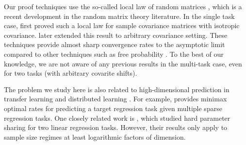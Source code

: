 Our proof techniques use the so-called local law of random matrices \cite{erdos2017dynamical}, which is a recent development in the random matrix theory literature.
In the single task case, \citet{isotropic} first proved such a local law for sample covariance matrices with isotropic covariance.
\citet{Anisotropic} later extended this result to arbitrary covariance setting.
These techniques provide almost sharp convergence rates to the asymptotic limit compared to other techniques such as free probability \cite{nica2006lectures}.
To the best of our knowledge, we are not aware of any previous results in the multi-task case, even for two tasks (with arbitrary covarite shifts).

The problem we study here is also related to high-dimensional prediction in transfer learning \cite{li2020transfer,bastani2020predicting} and distributed learning \cite{dobriban2018high}.
For example, \citet{li2020transfer} provides minimax optimal rates for predicting a target regression task given multiple sparse regression tasks.
One closely related work is \citet{WZR20}, which studied hard parameter sharing for two linear regression tasks.
However, their results only apply to sample size regimes at least logarithmic factors of dimension.



